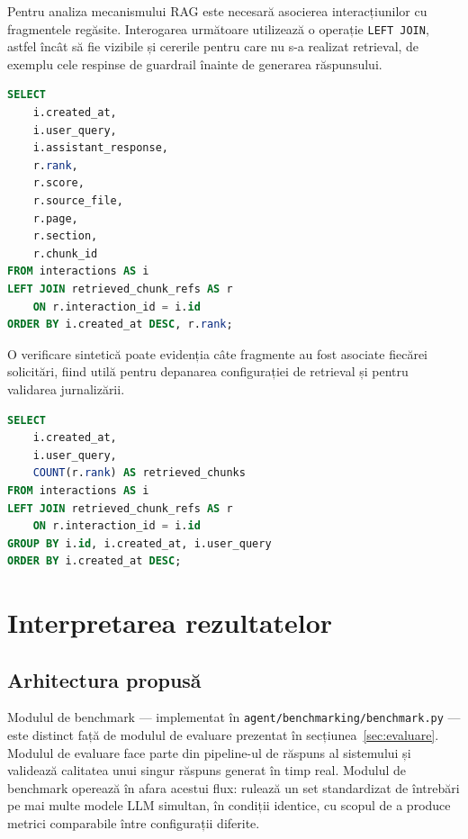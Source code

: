 \documentclass[12pt, a4paper, oneside, romanian]{teza-upb}
\begin{document}
Pentru analiza mecanismului RAG este necesară asocierea interacțiunilor cu fragmentele regăsite. Interogarea următoare utilizează o operație \texttt{LEFT JOIN}, astfel încât să fie vizibile și cererile pentru care nu s-a realizat retrieval, de exemplu cele respinse de guardrail înainte de generarea răspunsului.

\begin{center}
\begin{minipage}{0.68\textwidth}
\begin{lstlisting}[language=SQL, caption={Asocierea răspunsurilor cu sursele recuperate}]
SELECT
    i.created_at,
    i.user_query,
    i.assistant_response,
    r.rank,
    r.score,
    r.source_file,
    r.page,
    r.section,
    r.chunk_id
FROM interactions AS i
LEFT JOIN retrieved_chunk_refs AS r
    ON r.interaction_id = i.id
ORDER BY i.created_at DESC, r.rank;
\end{lstlisting}
\end{minipage}
\end{center}

O verificare sintetică poate evidenția câte fragmente au fost asociate fiecărei solicitări, fiind utilă pentru depanarea configurației de retrieval și pentru validarea jurnalizării.

\begin{center}
\begin{minipage}{0.68\textwidth}
\begin{lstlisting}[language=SQL, caption={Numărul fragmentelor recuperate pentru fiecare interacțiune}]
SELECT
    i.created_at,
    i.user_query,
    COUNT(r.rank) AS retrieved_chunks
FROM interactions AS i
LEFT JOIN retrieved_chunk_refs AS r
    ON r.interaction_id = i.id
GROUP BY i.id, i.created_at, i.user_query
ORDER BY i.created_at DESC;
\end{lstlisting}
\end{minipage}
\end{center}


\chapter{Interpretarea rezultatelor}

\section{Arhitectura propusă}

Modulul de benchmark --- implementat în \texttt{agent/benchmarking/benchmark.py} --- este distinct față de modulul de evaluare prezentat în secțiunea~\ref{sec:evaluare}. Modulul de evaluare face parte din pipeline-ul de răspuns al sistemului și validează calitatea unui singur răspuns generat în timp real. Modulul de benchmark operează în afara acestui flux: rulează un set standardizat de întrebări pe mai multe modele LLM simultan, în condiții identice, cu scopul de a produce metrici comparabile între configurații diferite. 
\end{document}
